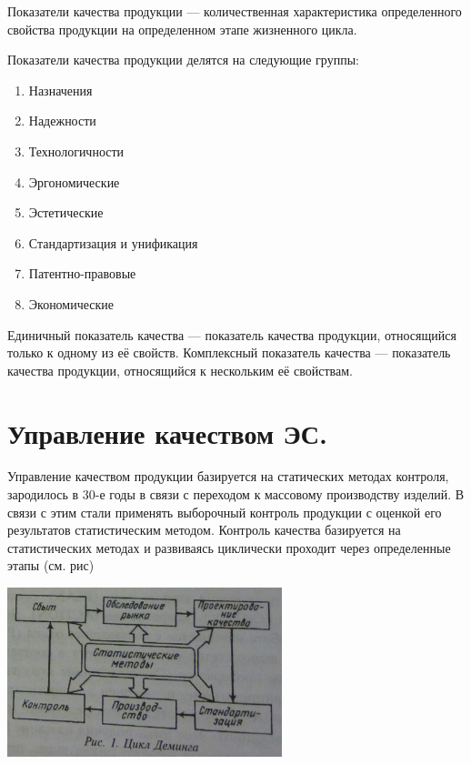 \documentclass[unicode, 12pt, a4paper, oneside]{article}
\begin{document}
Показатели качества продукции --- количественная характеристика определенного свойства продукции на определенном этапе жизненного цикла.

Показатели качества продукции делятся на следующие группы:
\begin{enumerate}
\item Назначения
\item Надежности
\item Технологичности
\item Эргономические
\item Эстетические
\item Стандартизация и унификация
\item Патентно-правовые
\item Экономические
\end{enumerate}

Единичный показатель качества --- показатель качества продукции, относящийся только к одному из её свойств. Комплексный показатель качества --- показатель качества продукции, относящийся к нескольким её свойствам.

\section{Управление качеством ЭС.}

Управление качеством продукции базируется на статических методах контроля, зародилось в 30-е годы в связи с переходом к массовому производству изделий. В связи с этим стали применять выборочный контроль продукции с оценкой его результатов статистическим методом.
Контроль качества базируется на статистических методах и развиваясь циклически проходит через определенные этапы (см. рис)
\begin{center} 
\includegraphics[width=0.6\textwidth]{32_Demming.png}\\
\end{center}
\end{document}

